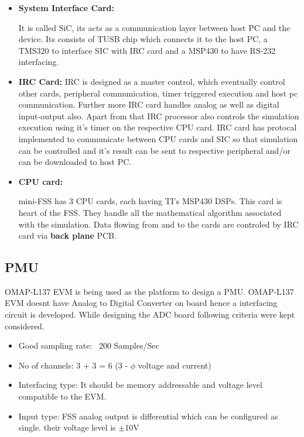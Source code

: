 \begin{itemize}
\item \textbf{System Interface Card:} 

It is called SiC, its acts as a communication layer between host PC and the device. Its consists of TUSB chip which connects it to the host PC, a TMS320 to interface SIC with IRC card and a MSP430 to have RS-232 interfacing.
\item \textbf{IRC Card:} IRC is designed as a master control, which eventually control other cards, peripheral communication, timer triggered execution and host pc communication. Further more IRC card handles analog as well as digital input-output also. Apart from that IRC processor also controls the simulation execution using it's timer on the respective CPU card. IRC card has protocal implemented to communicate between CPU cards and SIC so that simulation can be controlled and it's result can be sent to respective peripheral and/or can be downloaded to host PC.

\item \textbf{CPU card:} 

mini-FSS has 3 CPU cards, each having TI's MSP430 DSPs. This card is heart of the FSS. They handle all the mathematical algorithm associated with the simulation. Data flowing from and to the cards are controled by IRC card via \textbf{back plane} PCB.
\end{itemize}

\subsection{PMU}
OMAP-L137 EVM is being used as the platform to design a PMU. OMAP-L137 EVM doesnt have Analog to Digital Converter on board hence a interfacing circuit is developed. While designing the ADC board following criteria were kept considered.
\begin{itemize}
\item Good sampling rate: ~200 Samples/Sec
\item No of channels: 3 + 3 = 6 (3 - $\phi$ voltage and current) 
\item Interfacing type: It should be memory addressable and voltage level compatible  to the EVM.
\item Input type: FSS analog output is differential which can be configured as single. their voltage level is $\pm$10V
\end{itemize}

